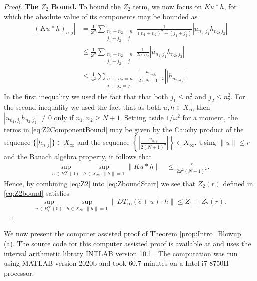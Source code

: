 \documentclass{article}
\newcommand{\cTrunc}{\hat{c}}
\begin{document}
\begin{proof}
 
\textbf{The $Z_2$ Bound.} 
To bound the $Z_2$ term, we now focus on $	K u * h $,  for which the absolute value of its components may be bounded as  
\begin{align}
\left|	(K u * h)_{n,j} \right|   &=
	\frac{1}{\omega^2}
	\sum_{\substack{n_1+n_2 =n\\j_1+j_2=j}}  \frac{1}{(n_1+ n_2)^2 - (j_1+j_2)} |u_{n_1,j_1} h_{n_2,j_2}| 
	\nonumber
	\\
		&\leq 
			\frac{1}{\omega^2}
			\sum_{\substack{n_1+n_2 =n\\j_1+j_2=j}}  \frac{1}{ 2 n_1 n_2  } |u_{n_1,j_1} h_{n_2,j_2}| 
			\nonumber
	\\
		&\leq 
			\frac{1}{\omega^2}
	\sum_{\substack{n_1+n_2 =n\\j_1+j_2=j}} 
	\left|
	\frac{u_{n_1,j_1} }{2 (N+1)^2 }
	\right| |h_{n_2,j_2}| .
	\label{eq:Z2ComponentBound}
\end{align}
 In the first inequality we  used the fact that that both $    j_1 \leq n_1^2$ and $    j_2 \leq n_2^2$. 
 For the second inequality we used the fact that as    both  $u, h \in X_\infty$ then  $| u_{n_1,j_1} h_{n_2,j_2}| \neq 0$ only if $ n_1,n_2 \geq N+1$. 
Setting aside $ 1/\omega^2$ for a moment, the terms in \eqref{eq:Z2ComponentBound} may be given by the Cauchy product of the sequence  $\{ |h_{n,j}|\} \in X_\infty$ and the sequence $\left\{ 	\left|
 \frac{u_{n,j} }{2 (N+1)^2 }
 \right|  \right\}\in X_\infty$. 
Using $\| u \| \leq r $ and  the Banach algebra property, it follows that  
\begin{align}\label{eq:Z2}
\sup_{u \in B^\infty_r(0)}
	\sup_{ h \in X_\infty, \|h\|=1 } 
	\| K u * h \| 
	&\leq \frac{r}{2 \omega^2 (N+1)^2}. 
\end{align}
Hence, by combining  \eqref{eq:Z2} into  \eqref{eq:ZboundStart} we see that $Z_2(r)$ defined in \eqref{eq:Z2bound} satisfies  
\[
\sup_{u \in B^\infty_r(0)}
\sup_{ h \in X_\infty, \|h\|=1 } 
\|	DT_\infty(\cTrunc + u) \cdot  h \|  \leq  Z_1 + Z_2(r) .
\]


\end{proof}

We now present the computer assisted proof of Theorem \ref{prop:Intro_Blowup} (a). 
	The source code for this  computer assisted proof is available at \cite{bib:codesIntegrableNonconservativeNLS} and  uses the interval arithmetic library INTLAB version 10.1 \cite{Ru99a}. 
The computation was run using  
MATLAB version  2020b and took $60.7$ minutes on a Intel i7-8750H processor. 
\end{document}
